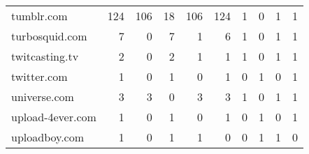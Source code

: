 \begin{tabular}{lrrrrrrrrr}
                 tumblr.com &                              124 &                                106 &                                     18 &                          106 &                         124 &                                   1 &                                      0 &                             1 &                            1 \\
             turbosquid.com &                                7 &                                  0 &                                      7 &                            1 &                           6 &                                   1 &                                      0 &                             1 &                            1 \\
             twitcasting.tv &                                2 &                                  0 &                                      2 &                            1 &                           1 &                                   1 &                                      0 &                             1 &                            1 \\
                twitter.com &                                1 &                                  0 &                                      1 &                            0 &                           1 &                                   0 &                                      1 &                             0 &                            1 \\
               universe.com &                                3 &                                  3 &                                      0 &                            3 &                           3 &                                   1 &                                      0 &                             1 &                            1 \\
           upload-4ever.com &                                1 &                                  0 &                                      1 &                            0 &                           1 &                                   0 &                                      1 &                             0 &                            1 \\
              uploadboy.com &                                1 &                                  0 &                                      1 &                            1 &                           0 &                                   0 &                                      1 &                             1 &                            0 \\

\end{tabular}
